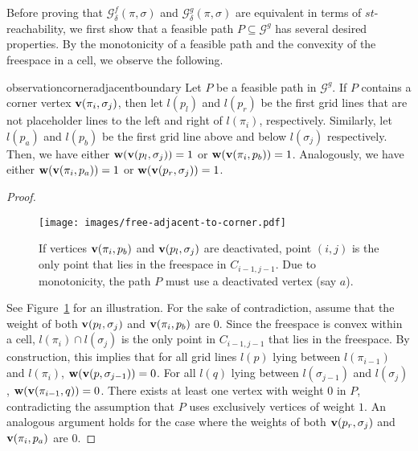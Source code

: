 \documentclass[thm-restate]{lipics-v2021}
\theoremstyle{remark}
\newcommand{\weight}[1]{\normalfont \textbf{w}(#1)}
\newcommand{\graph}[0]{\mathcal{G}}
\newcommand{\vertex}[1]{\normalfont \textbf{v}(#1)}
\newcommand{\fsgraph}[0]{\graph^{f}}
\newcommand{\cell}[1]{C_{#1}}
\newcommand{\ggraph}[0]{\graph^g}
\begin{document}
Before proving that $\fsgraph_\delta(\pi, \sigma)$ and $\ggraph_\delta(\pi, \sigma)$ are equivalent in terms of $st$-reachability, we first show that a feasible path $P \subseteq \ggraph$ has several desired properties. By the monotonicity of a feasible path and the convexity of the freespace in a cell, we observe the following. 
\begin{restatable}{observation}{corneradjacentboundary} \label{obs:corner-adjacent-to-boundary-1}
    Let $P$ be a feasible path in $\ggraph$. If $P$ contains a corner vertex $\vertex{\pi_i, \sigma_j}$, then let $l(p_l)$ and $l(p_r)$ be the first grid lines that are not placeholder lines to the left and right of $l(\pi_i)$, respectively. Similarly, let $l(p_a)$ and $l(p_b)$ be the first grid line above and below $l(\sigma_j)$ respectively. Then, we have either $\weight{\vertex{p_l, \sigma_j}} = 1$ or $\weight{\vertex{\pi_i, p_b}} = 1$. Analogously, we have either $\weight{\vertex{\pi_i, p_a}} = 1$ or $\weight{\vertex{p_r, \sigma_j}} = 1$. 
\end{restatable}
\begin{proof}
    \begin{figure}[tbh]
        \centering
        \texttt{[image: images/free-adjacent-to-corner.pdf]}
        \caption{If vertices $\vertex{\pi_i, p_b}$ and $\vertex{p_l, \sigma_j}$ are deactivated, point $(i, j)$ is the only point that lies in the freespace in $\cell{i - 1, j - 1}$. Due to monotonicity, the path $P$ must use a deactivated vertex (say $a$).}
        \label{fig:free-adjacent-to-corner}
    \end{figure}

    See Figure~\ref{fig:free-adjacent-to-corner} for an illustration. For the sake of contradiction, assume that the weight of both $\vertex{p_l, \sigma_j}$ and $\vertex{\pi_i, p_b}$ are $0$. Since the freespace is convex within a cell, $l(\pi_i) \cap l(\sigma_j)$ is the only point in $\cell{i - 1, j - 1}$ that lies in the freespace. By construction, this implies that for all grid lines $l(p)$ lying between $l(\pi_{i - 1})$ and $l(\pi_{i})$, $\weight{\vertex{p, \sigma_{j - 1}}} = 0$. For all $l(q)$ lying between $l(\sigma_{j -  1})$ and $l(\sigma_{j})$, $\weight{\vertex{\pi_{i - 1}, q}} = 0$. There exists at least one vertex with weight $0$ in $P$, contradicting the assumption that $P$ uses exclusively vertices of weight $1$. An analogous argument holds for the case where the weights of both $\vertex{p_r, \sigma_j}$ and $\vertex{\pi_i, p_a}$ are $0$. 
\end{proof}
\end{document}
